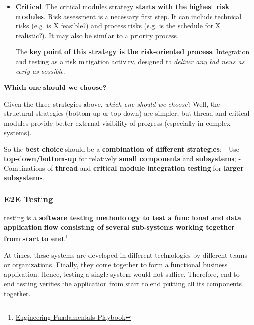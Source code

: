 \begin{itemize}
\begin{itemize}
        \item \textbf{Critical}. The critical modules strategy \textbf{starts with the highest risk modules}. Risk assessment is a necessary first step. It can include technical risks (e.g. is X feasible?) and process risks (e.g. is the schedule for X realistic?). It may also be similar to a priority process.

        The \textbf{key point of this strategy is the risk-oriented process}. Integration and testing as a risk mitigation activity, designed to \emph{deliver any bad news as early as possible}.
    \end{itemize}
\end{itemize}

\begin{flushleft}
    \textcolor{Green3}{ \textbf{Which one should we choose?}}
\end{flushleft}
Given the three strategies above, \emph{which one should we choose}? Well, the structural strategies (bottom-up or top-down) are simpler, but thread and critical modules provide better external visibility of progress (especially in complex systems).

\highspace
So the \textbf{best choice} should be a \textbf{combination of different strategies}:
- Use \textbf{top-down/bottom-up} for relatively \textbf{small components} and \textbf{subsystems};
- Combinations of \textbf{thread} and \textbf{critical module integration testing} for \textbf{larger subsystems}.

\newpage

\subsubsection{E2E Testing}

\begin{definitionbox}
     testing is a \textbf{software testing methodology to test a functional and data application flow consisting of several sub-systems working together from start to end}.\footnote{\href{https://microsoft.github.io/code-with-engineering-playbook/automated-testing/e2e-testing/}{Engineering Fundamentals Playbook}}
\end{definitionbox}

\noindent
At times, these systems are developed in different technologies by different teams or organizations. Finally, they come together to form a functional business application. Hence, testing a single system would not suffice. Therefore, end-to-end testing verifies the application from start to end putting all its components together.

